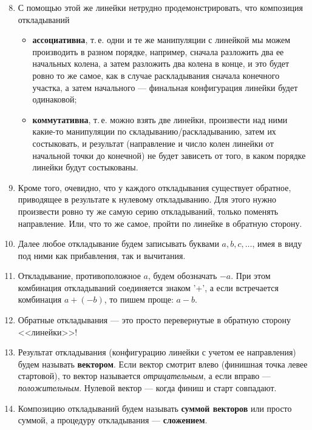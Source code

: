 \begin{enumerate}\setcounter{enumi}{7}
\item С помощью этой же линейки нетрудно продемонстрировать, что композиция откладываний
\begin{itemize}
\item \textbf{ассоциативна}, т.\,е. одни и те же манипуляции с линейкой мы можем производить в разном порядке, например, сначала разложить два ее начальных колена, а затем разложить два колена в конце, и это будет ровно то же самое, как в случае раскладывания сначала конечного участка, а затем начального --- финальная конфигурация линейки будет одинаковой;
\item \textbf{коммутативна}, т.\,е. можно взять две линейки, произвести над ними какие-то манипуляции по складыванию/раскладыванию, затем их состыковать, и результат (направление и число колен линейки от начальной точки до конечной) не будет зависеть от того, в каком порядке линейки будут состыкованы.
\end{itemize}
\item Кроме того, очевидно, что у каждого откладывания существует обратное, приводящее в результате к нулевому откладыванию. Для этого нужно произвести ровно ту же самую серию откладываний, только поменять направление. Или, что то же самое, пройти по линейке в обратную сторону.
\item Далее любое откладывание будем записывать буквами $a,b,c,\dots$, имея в виду под ними как прибавления, так и вычитания.
\item Откладывание, противоположное $a$, будем обозначать $-a$. При этом комбинация откладываний соединяется знаком '+', а если встречается комбинация $a+(-b)$, то пишем проще: $a-b$.
\item Обратные откладывания --- это просто перевернутые в обратную сторону <<линейки>>!
\item Результат откладывания (конфигурацию линейки с учетом ее направления) будем называть \textbf{вектором}. Если вектор смотрит влево (финишная точка левее стартовой), то вектор называется \textit{отрицательным}, а если вправо --- \textit{положительным}. Нулевой вектор --- когда финиш и старт совпадают.
\item Композицию откладываний будем называть \textbf{суммой векторов} или просто суммой, а процедуру откладывания --- \textbf{сложением}.
\end{enumerate}

